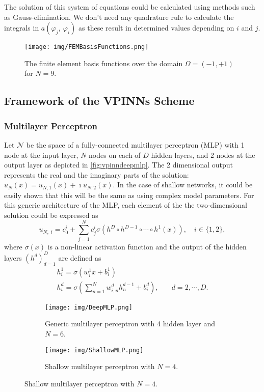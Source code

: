 The solution of this system of equations could be calculated using methods such as Gauss-elimination. We don't need any quadrature rule to calculate the integrals in $a(\varphi_j,\:\varphi_i)$ as these result in determined values depending on $i$ and $j$.

\begin{figure}[h]
    \centering
    \texttt{[image: img/FEMBasisFunctions.png]}
    \caption{The finite element basis functions over the domain $\Omega = (-1,+1)$ for $N=9$.}
    \label{fig:fembases}
\end{figure}

\subsection{Framework of the VPINNs Scheme}\label{sec:vpinnsframework}

\subsubsection{Multilayer Perceptron}\label{sec:vpinnsmlp}
Let $\mathcal{N}$ be the space of a fully-connected multilayer perceptron (MLP) with 1 node at the input layer, $N$ nodes on each of $D$ hidden layers, and 2 nodes at the output layer as depicted in \autoref{fig:vpinndeepmlp}. The 2 dimensional output represents the real and the imaginary parts of the solution: $u_N(x) = u_{N,1}(x) + \imath u_{N,2}(x)$. In the case of shallow networks, it could be easily shown that this will be the same as using complex model parameters. For this generic architecture of the MLP, each element of the the two-dimensional solution could be expressed as
\begin{equation}
    \label{eq:vpinngeneric}
    u_{N,\;i} = c_0^i + \sum_{j=1}^{N}{c_j^i \sigma(h^{D} \circ h^{D-1} \circ \cdots \circ h^1(x))}, \quad i \in \{1, 2\},
\end{equation}
where $\sigma (x)$ is a non-linear activation function and the output of the hidden layers ${(h^d)}_{d=1}^{D}$ are defined as
\begin{equation}
    \begin{aligned}
        h^1_i = \sigma(w^1_i x + b^1_i)& \\
        h^d_i = \sigma(\sum_{n=1}^{N}{w^d_{i, n} h^{d-1}_n} + b^d_i),& \quad d = 2, \cdots, D.
    \end{aligned}
\end{equation}

\begin{figure}[h!]
    \centering
    \begin{subfigure}[b]{0.45\textwidth}
        \texttt{[image: img/DeepMLP.png]}
        \caption{Generic multilayer perceptron with 4 hidden layer and $N=6$.}
        \label{fig:vpinndeepmlp}
    \end{subfigure}
    \hfill
    \begin{subfigure}[b]{0.45\textwidth}
        \texttt{[image: img/ShallowMLP.png]}
        \caption{Shallow multilayer perceptron with $N=4$.}
        \label{fig:vpinnshallowmlp}
    \end{subfigure}
\end{figure}

